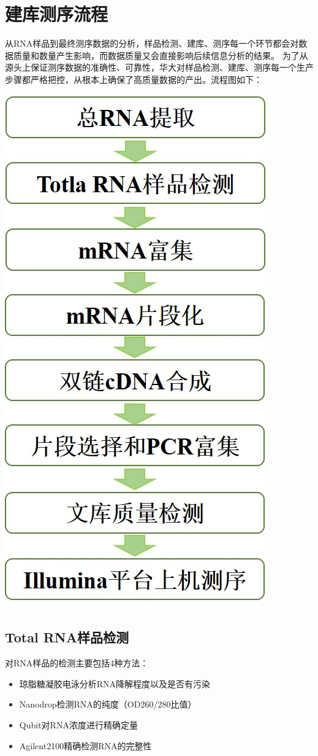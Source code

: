 \documentclass[10pt, oneside,a4paper]{article}
\begin{document}
\section{建库测序流程}
从RNA样品到最终测序数据的分析，样品检测、建库、测序每一个环节都会对数据质量和数量产生影响，而数据质量又会直接影响后续信息分析的结果。
为了从源头上保证测序数据的准确性、可靠性，华大对样品检测、建库、测序每一个生产步骤都严格把控，从根本上确保了高质量数据的产出。流程图如下：
\begin{center}
\includegraphics[width=45 mm, keepaspectratio]{./source/library_cst.jpg}
\end{center}
\subsection{Total RNA样品检测}
对RNA样品的检测主要包括4种方法：
\begin{itemize}
\item 琼脂糖凝胶电泳分析RNA降解程度以及是否有污染
\item Nanodrop检测RNA的纯度（OD260/280比值）
\item Qubit对RNA浓度进行精确定量
\item Agilent2100精确检测RNA的完整性
\end{itemize}
\end{document}
